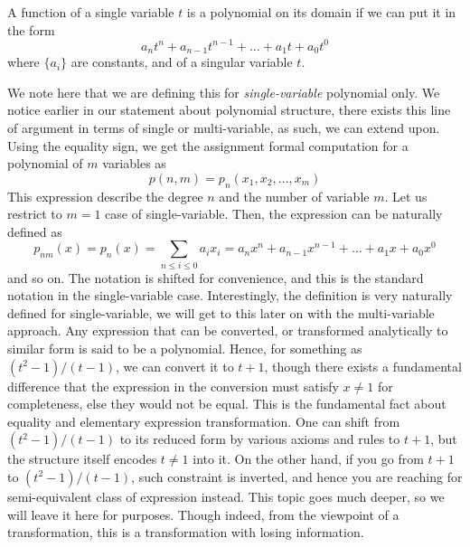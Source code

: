 \begin{definition}
    A function of a single variable $t$ is a polynomial on its domain if we can put it in the form 
    \begin{equation}
        a_{n}t^{n} + a_{n-1}t^{n-1} + \dots + a_{1}t + a_{0}t^{0}
    \end{equation}
    where $\{a_{i}\}$ are constants, and of a singular variable $t$.  
\end{definition}
We note here that we are defining this for \textit{single-variable} polynomial only. We notice earlier in our statement about polynomial structure, there exists this line of argument in terms of single or multi-variable, as such, we can extend upon. Using the equality sign, we get the assignment formal computation for a polynomial of $m$ variables as \begin{equation}
    p(n,m) = p_{n}(x_{1},x_{2},\dots,x_{m})
\end{equation}
This expression describe the degree $n$ and the number of variable $m$. Let us restrict to $m=1$ case of single-variable. Then, the expression can be naturally defined as 
\begin{equation}
    p_{nm}(x) = p_{n}(x) = \sum_{n\leq i \leq 0} a_{i}x_{i} = a_{n}x^{n} + a_{n-1}x^{n-1} + \dots + a_{1}x + a_{0}x^{0}
\end{equation}
and so on. The notation is shifted for convenience, and this is the standard notation in the single-variable case. Interestingly, the definition is very naturally defined for single-variable, we will get to this later on with the multi-variable approach. Any expression that can be converted, or transformed analytically to similar form is said to be a polynomial. Hence, for something as $(t^{2}-1)/(t-1)$, we can convert it to $t+1$, though there exists a fundamental difference that the expression in the conversion must satisfy $x\neq 1$ for completeness, else they would not be equal. This is the fundamental fact about equality and elementary expression transformation. One can shift from $(t^{2}-1)/(t-1)$ to its reduced form by various axioms and rules to $t+1$, but the structure itself encodes $t\neq 1$ into it. On the other hand, if you go from $t+1$ to $(t^{2}-1)/(t-1)$, such constraint is inverted, and hence you are reaching for semi-equivalent class of expression instead. This topic goes much deeper, so we will leave it here for purposes. Though indeed, from the viewpoint of a transformation, this is a transformation with losing information. 

